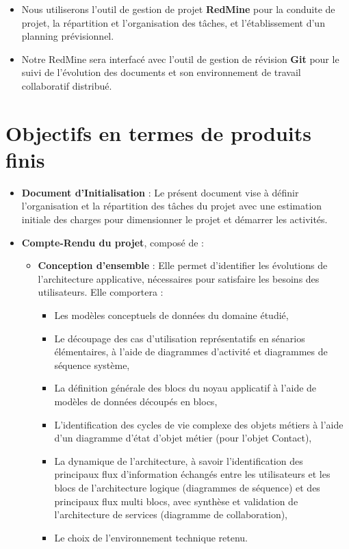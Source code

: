 \begin{itemize}
\item Nous utiliserons l'outil de gestion de projet \textbf{RedMine} pour la conduite de projet, la répartition et l'organisation des tâches, et l'établissement d'un planning prévisionnel.
\item Notre RedMine sera interfacé avec l'outil de gestion de révision \textbf{Git} pour le suivi de l'évolution des documents et son environnement de travail collaboratif distribué.
\end{itemize}

\section{Objectifs en termes de produits finis}

\begin{itemize}
\item \textbf{Document d'Initialisation} : Le présent document vise à définir l'organisation et la répartition des tâches du projet avec une estimation initiale des charges pour dimensionner le projet et démarrer les activités.
\item \textbf{Compte-Rendu du projet}, composé de :

\begin{itemize}
\item \textbf{Conception d'ensemble} : Elle permet d'identifier les évolutions de l'architecture applicative, nécessaires pour satisfaire les besoins des utilisateurs. Elle comportera :

\begin{itemize}
\item Les modèles conceptuels de données du domaine étudié,
\item Le découpage des cas d'utilisation représentatifs en sénarios élémentaires, à l'aide de diagrammes d'activité et diagrammes de séquence système,
\item La définition générale des blocs du noyau applicatif à l'aide de modèles de données découpés en blocs,
\item L'identification des cycles de vie complexe des objets métiers à l'aide d'un diagramme d'état d'objet métier (pour l'objet Contact),
\item La dynamique de l'architecture, à savoir l'identification des principaux flux d'information échangés entre les utilisateurs et les blocs de l'architecture logique (diagrammes de séquence) et des principaux flux multi blocs, avec synthèse et validation de l'architecture de services (diagramme de collaboration),
\item Le choix de l'environnement technique retenu.
\end{itemize}


\end{itemize}
\end{itemize}
